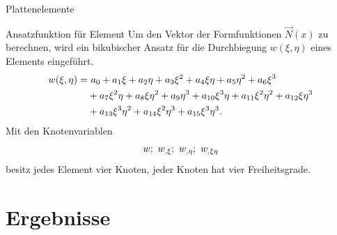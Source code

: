\begin{frame}{Plattenelemente}
	\begin{block}{Ansatzfunktion für Element}
	Um den Vektor der Formfunktionen $\vec{N}(x)$ zu berechnen, wird ein bikubischer Ansatz für die Durchbiegung $ w(\xi, \eta) $ eines Elements eingeführt.\\
	\begin{equation*}
	\setlength\abovedisplayskip{2pt}
	\setlength\belowdisplayskip{2pt}
	\begin{split}
	w(\xi,\eta) = & \ a_{0} + a_{1}\xi + a_{2}\eta + a_{3}\xi^{2} + a_{4}\xi\eta + a_{5}\eta^{2} + a_{6}\xi^{3} \\
	& + a_{7}\xi^{2}\eta + a_{8}\xi\eta^{2} + a_{9}\eta^{3} + a_{10}\xi^{3}\eta + a_{11}\xi^{2}\eta^{2} + a_{12}\xi\eta^{3} \\
	& + a_{13}\xi^{3}\eta^{2} + a_{14}\xi^{2}\eta^{3} + a_{15}\xi^{3}\eta^{3}.
	\end{split}
	\end{equation*}
	Mit den Knotenvariablen
	\begin{equation*}
	\setlength\abovedisplayskip{2pt}
	\setlength\belowdisplayskip{2pt}
	w; \ w_{,\xi}; \ w_{,\eta}; \ w_{,\xi\eta}
	\end{equation*}
	besitz jedes Element vier Knoten, jeder Knoten hat vier Freiheitsgrade. \\
	\end{block}
\end{frame}

\section{Ergebnisse}
